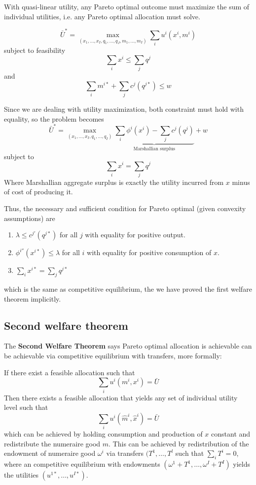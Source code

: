 \documentclass[twocolumn, fleqn]{article}
\begin{document}
		With quasi-linear utility, any Pareto optimal outcome must maximize the sum of individual utilities, i.e. any Pareto optimal allocation must solve.
		
		\[
		\bar{U}^* = \max_{(x_1, \dots, x_I, q_1, \dots, q_J, m_1, \dots, m_I)} \sum_i u^i(x^i, m^i)
		\]
		subject to feasibility
		\[
		\sum_i x^i \leq \sum_j q^j
		\]
		and
		\[
		\sum_i m^{i*} + \sum_j c^j(q^{j*}) \leq w
		\]
		
		Since we are dealing with utility maximization, both constraint must hold with equality, so the problem becomes 
		\[
		\bar{U}^* = \max_{(x_1, \dots, x_I, q_1, \dots, q_I)} \underbrace{\sum_i \phi^i(x^i) - \sum_j c^j(q^j)}_{\text{Marshallian surplus}} + w
		\]
		subject to
		\[
		\sum_i x^i = \sum_j q^j
		\]
		Where Marshallian aggregate surplus is exactly the utility incurred from $x$ minus of cost of producing it.
		
		Thus, the necessary and sufficient condition for Pareto optimal (given convexity assumptions) are 
		\begin{enumerate}
    	\item \(\lambda \leq c^{j'}(q^{j*})\) for all \(j\)
   		 with equality for positive output.
    	\item \(\phi^{i''}(x^{i*}) \leq \lambda\) for all \(i\)
   		with equality for positive consumption of \(x\).
    	\item \(\sum_i x^{i*} = \sum_j q^{j*}\)
		\end{enumerate}
		which is the same as competitive equilibrium, the we have proved the first welfare theorem implicitly.
		
		\subsection{Second welfare theorem}
		
		The \textbf{Second Welfare Theorem} says Pareto optimal allocation is achievable can be achievable via competitive equilibrium with transfers, more formally:
		
		If there exist a feasible allocation such that 
		\[\sum_i u^i (m^i, x^i) = \bar{U}\]
		Then there exists a feasible allocation that yields any set of individual utility level such that 
		\[\sum_i u^i (\hat{m}^i, \hat{x}^i) = \bar{U}\]
		which can be achieved by holding consumption and production of $x$ constant and redistribute the numeraire good $m$. This can be achieved by redistribution of the endowment of numeraire good $\omega^i$ via transfers $(T^1, \ldots, T^l$ such that $\sum_i T^i = 0$, where an competitive equilibrium with endowments \((\omega^1 + T^1, \dots, \omega^I + T^I)\) yields the utilities \((u^{1*}, \dots, u^{I*})\).
		
\end{document}
